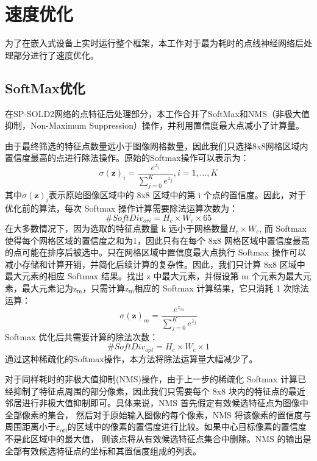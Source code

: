 \section{速度优化}
为了在嵌入式设备上实时运行整个框架，本工作对于最为耗时的点线神经网络后处理部分进行了速度优化。
\subsection{SoftMax优化}
在SP-SOLD2网络的点特征后处理部分，本工作合并了SoftMax和NMS（非极大值抑制，Non-Maximum Suppression）操作，并利用置信度最大点减小了计算量。

由于最终筛选的特征点数量远小于图像网格数量，因此我们只选择8x8网格区域内置信度最高的点进行除法操作。原始的Softmax操作可以表示为：
\[\sigma(\mathbf{z})_i=\frac{e^{z_i}}{\sum_{j=0}^Ke^{z_j}},i=1,\ldots,K\]
其中$\sigma(\mathbf{z})_i$表示原始图像区域中的 8x8 区域中的第 i 个点的置信度。因此，对于优化前的算法，每次 Softmax 操作计算需要除法运算次数为：
\[
  \#SoftDiv_{ori}=H_{c}\times W_{c}\times 65
\]
在大多数情况下，因为选取的特征点数量 k 远小于网格数量$H_c\times W_c$, 而 Softmax 使得每个网格区域的置信度之和为1，因此只有在每个 8x8 网格区域中置信度最高的点可能在排序后被选中。只在网格区域中置信度最大点执行 Softmax 操作可以减小存储和计算开销，并简化后续计算的复杂性。因此，我们只计算 8x8 区域中最大元素的相应 Softmax 结果。找出 z 中最大元素，并假设第 m 个元素为最大元素，最大元素记为$\mathrm{z_m}$，只需计算$\mathrm{z_m}$相应的 Softmax 计算结果，它只消耗 1 次除法运算：
\[
  \sigma(\mathbf{z})_m=\frac{e^{z_m}}{\sum_{j=0}^Ke^{z_j}}
\]
Softmax 优化后共需要计算的除法次数：
\[\#SoftDiv_{opt}=H_c\times W_c\times1\]
通过这种稀疏化的Softmax操作，本方法将除法运算量大幅减少了。

对于同样耗时的非极大值抑制(NMS)操作，由于上一步的稀疏化 Softmax 计算已经抑制了特征点周围的部分像素，因此我们只需要每个 8x8 块内的特征点的最近邻居进行非极大值抑制即可。具体来说，NMS 首先假定有效候选特征点为图像中全部像素的集合， 然后对于原始输入图像的每个像素，NMS 将该像素的置信度与周围距离小于$\varepsilon_\mathrm{ori}$的区域中的像素的置信度进行比较。如果中心目标像素的置信度不是此区域中的最大值， 则该点将从有效候选特征点集合中删除。NMS 的输出是全部有效候选特征点的坐标和其置信度组成的列表。

